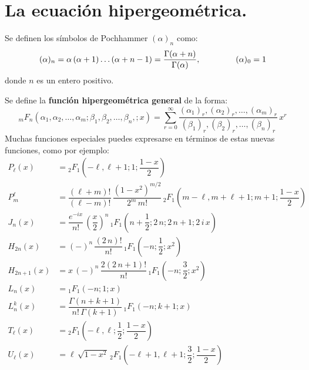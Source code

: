 \section{La ecuación hipergeométrica.}
Se definen los símbolos de Pochhammer $(\alpha)_{n}$ como:
\[ (\alpha)_{n} = \alpha \, (\alpha + 1) \ldots (\alpha + n -1) = \dfrac{\Gamma (\alpha + n)}{\Gamma (\alpha)}, \hspace{1.5cm} (\alpha)_{0} = 1 \]
donde $n$ es un entero positivo.
\par
Se define la \textbf{función hipergeométrica general} de la forma:
\begin{equation}
{}_{m}F_{n} (\alpha_{1}, \alpha_{2}, \ldots, \alpha_{m}; \beta_{1}, \beta_{2}, \ldots, \beta_{n},; x) = \sum_{r=0}^{\infty} \dfrac{(\alpha_{1})_{r}, (\alpha_{2})_{r}, \ldots, (\alpha_{m})_{r}}{(\beta_{1})_{r}, (\beta_{2})_{r}, \ldots, (\beta_{n})_{r}} \, x^{r}
\label{eq:ecuacion_08_91}
\end{equation}
Muchas funciones especiales puedes expresarse en términos de estas nuevas funciones, como por ejemplo:
\begin{align*}
P_{\ell} (x) &= {}_{2}F_{1} \left( -\ell , \ell + 1; 1; \dfrac{1 - x}{2} \right) \\[1em]
P_{m}^{\ell} &= \dfrac{(\ell + m)!}{(\ell - m)!} \, \dfrac{(1 - x^{2})^{m/2}}{2^{m} \, m!} \, {}_{2}F_{1} \left( m - \ell, m + \ell + 1; m + 1; \dfrac{1 - x}{2} \right) \\[1em]
J_{n} (x) &= \dfrac{e^{-i x}}{n!} \, \left( \dfrac{x}{2} \right)^{n} \, {}_1 F_{1} \left( n + \dfrac{1}{2}; 2 \, n; 2 \, n + 1; 2 \, i \, x \right) \\[1em]
H_{2 n} (x) &= (-)^{n} \, \dfrac{(2 \, n)!}{n!} \, {}_1 F_{1} \left( -n; \dfrac{1}{2}; x^{2} \right) \\[1em]
H_{2 n+1} (x) &= x \, (-)^{n} \, \dfrac{2 (2 \, n + 1)!}{n!} \, {}_1 F_{1} \left( -n; \dfrac{3}{2}; x^{2}\right) \\[1em]
L_{n} (x) &= {}_{1} F_{1} (-n; 1; x)\\[1em]
L_{n}^{k} (x) &= \dfrac{\Gamma (n +  k + 1)}{n! \, \Gamma (k + 1)} \, {}_{1} F_{1} (-n; k + 1; x) \\[1em]
T_{\ell} (x) &= {}_{2} F_{1} \left( -\ell, \ell; \dfrac{1}{2}; \dfrac{1 - x}{2} \right) \\[1em]
U_{\ell}(x) &= \ell \,\sqrt{1- x^{2}} \, {}_{2} F_{1} \left( -\ell + 1, \ell+1; \dfrac{3}{2}; \dfrac{1-x}{2} \right)
\end{align*}

